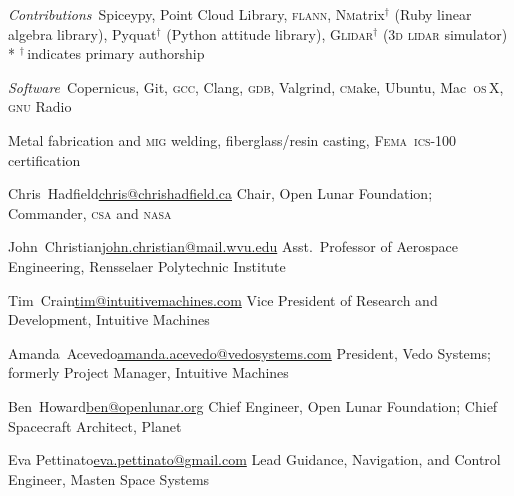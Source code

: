 \documentclass[12pt,letterpaper]{article}
\newcommand{\mhead}[1]{\leavevmode\marginpar{\sffamily\footnotesize #1}}
\newcommand{\rdate}[1]{{\hfill #1}}
\begin{document}
\medskip
\emph{Contributions}\ 
Spiceypy, %
Point Cloud Library, %
\textsc{flann}, %
\textsc{Nm}atrix$^\dagger$ (Ruby linear algebra library),
Pyquat$^\dagger$ (Python attitude library),
\textsc{Glidar}$^\dagger$ (\textsc{3d lidar} simulator)
\\*
\medskip
$^\dagger$\,{\footnotesize indicates primary authorship}

\medskip
\emph{Software}\
Copernicus, 
Git,
\textsc{gcc},
Clang,
\textsc{gdb},
Valgrind,
\textsc{cm}ake,
Ubuntu,
Mac~\textsc{os\,}X,
\textsc{gnu} Radio

\bigskip
\mhead{Other Skills}%
Metal fabrication and \textsc{mig} welding, fiberglass/resin casting, \textsc{Fema~ics}-100 certification

\bigskip
\mhead{References}%
Chris~Hadfield\rdate{\href{mailto:chris@chrishadfield.ca}{chris@chrishadfield.ca}}\newline
Chair, Open Lunar Foundation; Commander, \textsc{csa} and \textsc{nasa}

\medskip
John~Christian\rdate{\href{mailto:john.christian@mail.wvu.edu}{john.christian@mail.wvu.edu}}\newline
Asst.\ Professor of Aerospace Engineering, Rensselaer Polytechnic Institute

\medskip
Tim~Crain\rdate{\href{mailto:tim@intuitivemachines.com}{tim@intuitivemachines.com}}\newline
Vice President of Research and Development, Intuitive Machines

\medskip
Amanda~Acevedo\rdate{\href{mailto:amanda.acevedo@vedosystems.com}{amanda.acevedo@vedosystems.com}}\newline
President, Vedo Systems; formerly Project Manager, Intuitive Machines

\medskip
Ben~Howard\rdate{\href{mailto:ben@openlunar.org}{ben@openlunar.org}}\newline
Chief Engineer, Open Lunar Foundation; Chief Spacecraft Architect, Planet

\medskip
Eva Pettinato\rdate{\href{mailto:eva.pettinato@gmail.com}{eva.pettinato@gmail.com}}\newline
Lead Guidance, Navigation, and Control Engineer, Masten Space Systems

\end{document}
